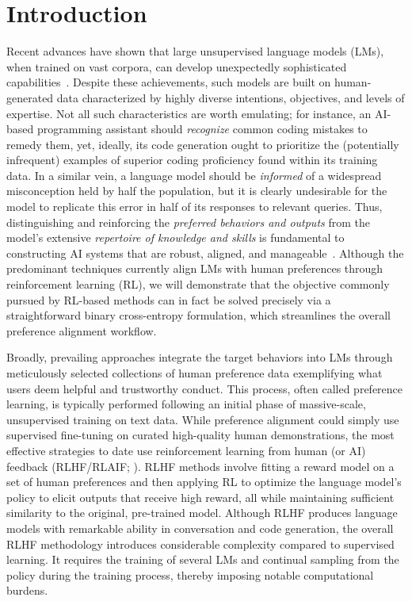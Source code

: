 \section{Introduction}
Recent advances have shown that large unsupervised language models (LMs), when trained on vast corpora, can develop unexpectedly sophisticated capabilities~\citep{chowdhery2022palm, brown2020language, touvron2023llama, bubeck2023sparks}. Despite these achievements, such models are built on human-generated data characterized by highly diverse intentions, objectives, and levels of expertise. Not all such characteristics are worth emulating; for instance, an AI-based programming assistant should \textit{recognize} common coding mistakes to remedy them, yet, ideally, its code generation ought to prioritize the (potentially infrequent) examples of superior coding proficiency found within its training data. In a similar vein, a language model should be \textit{informed} of a widespread misconception held by half the population, but it is clearly undesirable for the model to replicate this error in half of its responses to relevant queries. Thus, distinguishing and reinforcing the \emph{preferred behaviors and outputs} from the model’s extensive \textit{repertoire of knowledge and skills} is fundamental to constructing AI systems that are robust, aligned, and manageable~\citep{ouyang2022training}. Although the predominant techniques currently align LMs with human preferences through reinforcement learning (RL), we will demonstrate that the objective commonly pursued by RL-based methods can in fact be solved precisely via a straightforward binary cross-entropy formulation, which streamlines the overall preference alignment workflow.

Broadly, prevailing approaches integrate the target behaviors into LMs through meticulously selected collections of human preference data exemplifying what users deem helpful and trustworthy conduct. This process, often called preference learning, is typically performed following an initial phase of massive-scale, unsupervised training on text data. While preference alignment could simply use supervised fine-tuning on curated high-quality human demonstrations, the most effective strategies to date use reinforcement learning from human (or AI) feedback (RLHF/RLAIF; \citep{christiano2017deep,bai2022constitutional}). RLHF methods involve fitting a reward model on a set of human preferences and then applying RL to optimize the language model’s policy to elicit outputs that receive high reward, all while maintaining sufficient similarity to the original, pre-trained model. Although RLHF produces language models with remarkable ability in conversation and code generation, the overall RLHF methodology introduces considerable complexity compared to supervised learning. It requires the training of several LMs and continual sampling from the policy during the training process, thereby imposing notable computational burdens.

